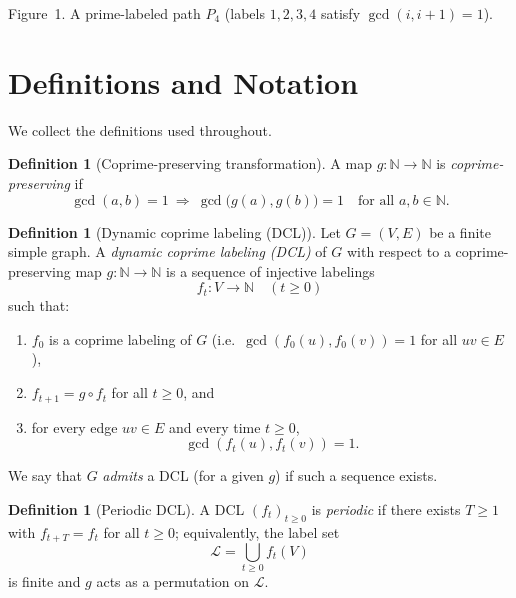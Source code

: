 \documentclass[12pt]{amsart}
\theoremstyle{plain}
\theoremstyle{definition}
\newtheorem{defn}[thm]{Definition}
\theoremstyle{remark}
\numberwithin{equation}{section}
\begin{document}
\begin{center}

\vspace{2mm}
\small Figure~1. A prime-labeled path $P_4$ (labels $1,2,3,4$ satisfy $\gcd(i,i+1)=1$).
\end{center}

\section{Definitions and Notation}
We collect the definitions used throughout.

\begin{defn}[Coprime-preserving transformation]\label{def:cpp}
A map $g:\mathbb{N}\to\mathbb{N}$ is \emph{coprime-preserving} if
\[
\gcd(a,b)=1 \ \Longrightarrow\ \gcd\bigl(g(a),g(b)\bigr)=1
\quad\text{for all }a,b\in\mathbb{N}.
\]
\end{defn}

\begin{defn}[Dynamic coprime labeling (DCL)]\label{def:DCL}
Let $G=(V,E)$ be a finite simple graph. A \emph{dynamic coprime labeling (DCL)} of $G$ with respect to a coprime-preserving map $g:\mathbb{N}\to\mathbb{N}$ is a sequence of injective labelings
\[
f_t:V\to\mathbb{N} \quad (t\ge0)
\]
such that:
\begin{enumerate}
    \item $f_0$ is a coprime labeling of $G$ (i.e.\ $\gcd(f_0(u),f_0(v))=1$ for all $uv\in E$),
    \item $f_{t+1}=g\circ f_t$ for all $t\ge0$, and
    \item for every edge $uv\in E$ and every time $t\ge0$,
    \[
      \gcd(f_t(u),f_t(v))=1.
    \]
\end{enumerate}
We say that $G$ \emph{admits} a DCL (for a given $g$) if such a sequence exists.
\end{defn}

\begin{defn}[Periodic DCL]\label{def:periodic}
A DCL $(f_t)_{t\ge0}$ is \emph{periodic} if there exists $T\ge1$ with $f_{t+T}=f_t$ for all $t\ge0$; equivalently, the label set
\[
\mathcal{L}=\bigcup_{t\ge0} f_t(V)
\]
is finite and $g$ acts as a permutation on $\mathcal{L}$.
\end{defn}
\end{document}
